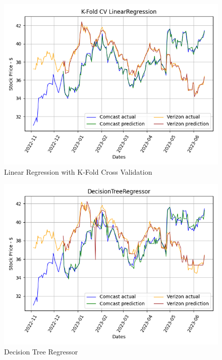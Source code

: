 \documentclass[conference]{IEEEtran}
\begin{document}
\begin{figure}
    \includegraphics[width=\columnwidth]{K-Fold CV LinearRegression}
    \caption{Linear Regression with K-Fold Cross Validation}
\end{figure}

\begin{figure}
    \includegraphics[width=\columnwidth]{DecisionTreeRegressor}
    \caption{Decision Tree Regressor}
\end{figure}
\end{document}
